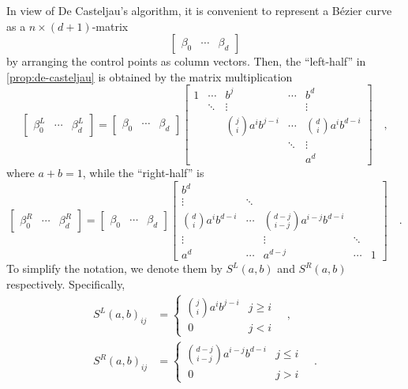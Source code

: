 \documentclass[pdftex,a4paper,12pt]{scrartcl}
\theoremstyle{plain}
\theoremstyle{definition}
\theoremstyle{remark}
\numberwithin{equation}{section}
\begin{document}
In view of De Casteljau's algorithm, it is convenient to represent a B\'ezier curve as a $n\times (d+1)$-matrix
\[
\begin{bmatrix}\beta_0 & \cdots & \beta_d\end{bmatrix}
\]
by arranging the control points as column vectors.
Then, the ``left-half'' in \cref{prop:de-casteljau} is obtained by the matrix multiplication
\[
\begin{bmatrix}\beta^L_0 & \cdots & \beta^L_d\end{bmatrix}
= \begin{bmatrix}\beta_0 & \cdots & \beta_d\end{bmatrix}
\begin{bmatrix}
1 & \cdots & b^j & \cdots & b^d \\
& \ddots & \vdots && \vdots\\
&& \binom{j}{i}a^ib^{j-i} & \cdots & \binom{d}{i}a^ib^{d-i} \\
&&& \ddots & \vdots \\
&&&& a^d
\end{bmatrix}
\quad,
\]
where $a+b=1$, while the ``right-half'' is
\[
\begin{bmatrix}\beta^R_0 & \cdots & \beta^R_d\end{bmatrix}
= \begin{bmatrix}\beta_0 & \cdots & \beta_d\end{bmatrix}
\begin{bmatrix}
b^d &&&& \\
\vdots & \ddots &&& \\
\binom{d}{i}a^ib^{d-i} & \cdots & \binom{d-j}{i-j}a^{i-j}b^{d-i} && \\
\vdots && \vdots & \ddots & \\
a^d & \cdots & a^{d-j} & \cdots & 1
\end{bmatrix}
\quad.
\]
To simplify the notation, we denote them by $S^L(a,b)$ and $S^R(a,b)$ respectively.
Specifically,
\[
\begin{split}
S^L(a,b)_{ij} &=
\begin{cases}
\displaystyle\binom{j}{i}a^ib^{j-i} & j\ge i\\
\ 0 & j < i
\end{cases}
\quad,
\\
S^R(a,b)_{ij} &=
\begin{cases}
\displaystyle\binom{d-j}{i-j}a^{i-j}b^{d-i} & j \le i\\
\ 0 & j > i
\end{cases}
\quad.
\end{split}
\]
\end{document}

